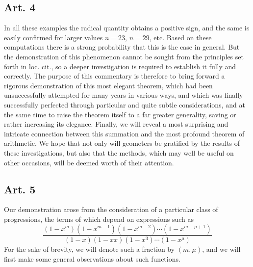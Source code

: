 \documentclass{book}
\theoremstyle{plain}
\theoremstyle{remark}
\begin{document}
\subsection*{Art. 4} 

In all these examples the radical quantity obtains a positive sign, and the same is easily confirmed for larger values $n=23$, $n=29$, etc.  Based on these computations there is a strong probability that this is the case in general.   But the demonstration of this phenomenon cannot be sought from the principles set forth in loc. cit., so a deeper investigation is required to establish it fully and correctly.   The purpose of this commentary is therefore to bring forward a rigorous demonstration of this most elegant theorem, which had been unsuccessfully attempted for many years in various ways, and which was finally successfully perfected through particular and quite subtle considerations, and at the same time to raise the theorem itself to a far greater generality, saving or rather increasing its elegance.  Finally, we will reveal a most surprising and intricate connection between this summation and the most profound theorem of arithmetic.  We hope that not only will geometers be gratified by the results of these investigations, but also that the methods, which may well be useful on other occasions, will be deemed worth of their attention.

\subsection*{Art. 5} 

Our demonstration arose from the consideration of a particular class of progressions, the terms of which depend on expressions such as 
\[ \frac{(1-x^m)(1-x^{m-1})(1-x^{m-2}) \cdots ( 1- x^{m-\mu+1})}{(1-x)(1-xx)(1-x^3) \cdots (1-x^\mu)} \]
For the sake of brevity, we will denote such a fraction by $(m, \mu)$, and we will first make some general observations about such functions.
\end{document}
